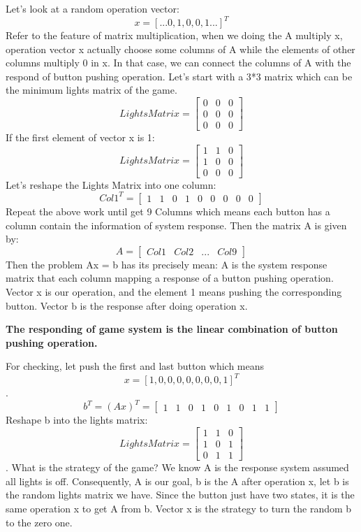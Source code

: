 \documentclass[]{article}
\begin{document}
Let's look at a random operation vector:
\begin{equation}
x = [...0,1,0,0,1...]^{T}
\end{equation}
Refer to the feature of matrix multiplication, when we doing the A multiply x, operation vector x actually choose some columns of A while the elements of other columns multiply 0 in x. In that case, we can connect the columns of A with the respond of button pushing operation.
Let's start with a 3*3 matrix which can be the minimum lights matrix of the game.
$$
Lights Matrix = \begin{bmatrix} 0 & 0 & 0\\ 0 & 0 & 0 \\ 0 & 0 & 0\end{bmatrix} 
$$
If the first element of vector x is 1:
$$
Lights Matrix = \begin{bmatrix} 1 & 1 & 0\\ 1 & 0 & 0 \\ 0 & 0 & 0\end{bmatrix} 
$$
Let's reshape the Lights Matrix into one column:
$$
Col1^{T} = \begin{bmatrix} 1 & 1 & 0 & 1 & 0 & 0 & 0 & 0 & 0\end{bmatrix} 
$$
Repeat the above work until get 9 Columns which means each button has a column contain the information of system response. Then the matrix A is given by:
$$
A = \begin{bmatrix} Col1 & Col2 &...& Col9\end{bmatrix} 
$$
Then the problem Ax = b has its precisely mean:
A is the system response matrix that each column mapping a response of a button pushing operation. Vector x is our operation, and the element 1 means pushing the corresponding button. Vector b is the response after doing operation x. 

\textbf{The responding of game system is the linear combination of button pushing operation.}   

For checking, let push the first and last button which means
$$x = [1,0,0,0,0,0,0,0,1]^{T}$$.
$$
b^{T} = (Ax)^{T} = \begin{bmatrix} 1 & 1 & 0 & 1 & 0 & 1 & 0 & 1 & 1\end{bmatrix} 
$$
Reshape b into the lights matrix:
$$
LightsMatrix = \begin{bmatrix} 1 & 1 & 0 \\ 1 & 0 & 1 \\ 0 & 1 & 1\end{bmatrix} 
$$
. What is the strategy of the game?
We know A is the response system assumed all lights is off. Consequently, A is our goal, b is the A after operation x, let b is the random lights matrix we have. Since the button just have two states, it is the same operation x to get A from b. Vector x is the strategy to turn the random b to the zero one.
\\
\end{document}

